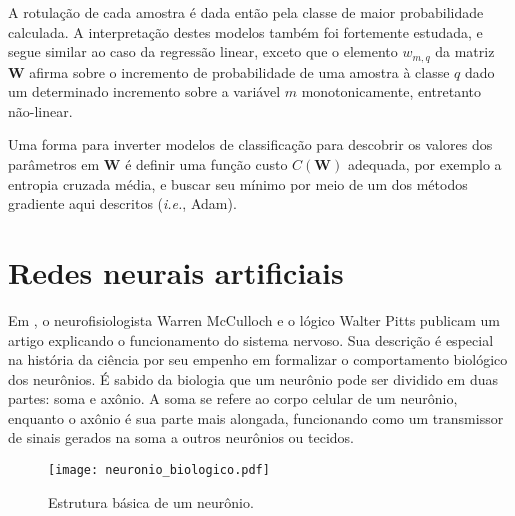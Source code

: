     A rotulação de cada amostra é dada então pela classe de maior probabilidade calculada. A interpretação destes modelos também foi fortemente estudada, e segue similar ao caso da regressão linear, exceto que o elemento $w_{m,q}$ da matriz $\boldsymbol{W}$ afirma sobre o incremento de probabilidade de uma amostra à classe $q$ dado um determinado incremento sobre a variável $m$ monotonicamente, entretanto não-linear. \DIFaddbegin {} \DIFaddend 

    Uma forma para inverter modelos de classificação para descobrir os valores dos parâmetros em $\boldsymbol{W}$ é definir uma função custo $C(\boldsymbol{W})$ adequada, por exemplo a entropia cruzada média, e buscar seu mínimo por meio de um dos métodos gradiente aqui descritos (\textit{i.e.}, Adam).

  \section{Redes neurais artificiais}

    Em , o neurofisiologista Warren McCulloch e o lógico Walter Pitts publicam um artigo explicando o funcionamento do sistema nervoso. Sua descrição é especial na história da ciência por seu empenho em formalizar o comportamento biológico dos neurônios. É sabido da biologia que um neurônio pode ser dividido em duas partes: soma e axônio. A soma se refere ao corpo celular de um neurônio, enquanto o axônio é sua parte mais alongada, funcionando como um transmissor de sinais gerados na soma a outros neurônios ou tecidos.

    \begin{figure}
      \begin{center}
        \texttt{[image: neuronio\_biologico.pdf]}
      \end{center}
      \caption{Estrutura básica de um neurônio.}
      \label{f:neuronio_biologico}
    \end{figure}


